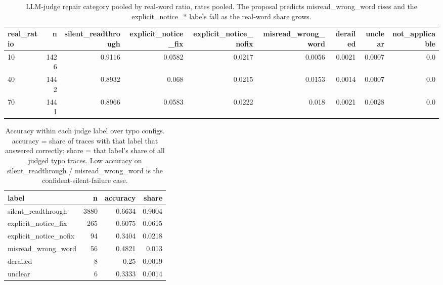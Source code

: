 \documentclass[11pt]{article}
\begin{document}
\begin{table}[H]
\centering
\caption{LLM-judge repair category pooled by real-word ratio, rates pooled. The proposal predicts misread\_wrong\_word rises and the explicit\_notice\_* labels fall as the real-word share grows.}
\small
\begin{adjustbox}{max width=\textwidth}
\begin{tabular}{lrrrrrrrr}
\toprule
\textbf{real\_ratio} & \textbf{n} & \textbf{silent\_readthrough} & \textbf{explicit\_notice\_fix} & \textbf{explicit\_notice\_nofix} & \textbf{misread\_wrong\_word} & \textbf{derailed} & \textbf{unclear} & \textbf{not\_applicable} \\
\midrule
10 & 1426 & 0.9116 & 0.0582 & 0.0217 & 0.0056 & 0.0021 & 0.0007 & 0.0 \\
40 & 1442 & 0.8932 & 0.068 & 0.0215 & 0.0153 & 0.0014 & 0.0007 & 0.0 \\
70 & 1441 & 0.8966 & 0.0583 & 0.0222 & 0.018 & 0.0021 & 0.0028 & 0.0 \\
\bottomrule
\end{tabular}
\end{adjustbox}
\end{table}

\begin{table}[H]
\centering
\caption{Accuracy within each judge label over typo configs. accuracy = share of traces with that label that answered correctly; share = that label's share of all judged typo traces. Low accuracy on silent\_readthrough / misread\_wrong\_word is the confident-silent-failure case.}
\small
\begin{adjustbox}{max width=\textwidth}
\begin{tabular}{lrrr}
\toprule
\textbf{label} & \textbf{n} & \textbf{accuracy} & \textbf{share} \\
\midrule
silent\_readthrough & 3880 & 0.6634 & 0.9004 \\
explicit\_notice\_fix & 265 & 0.6075 & 0.0615 \\
explicit\_notice\_nofix & 94 & 0.3404 & 0.0218 \\
misread\_wrong\_word & 56 & 0.4821 & 0.013 \\
derailed & 8 & 0.25 & 0.0019 \\
unclear & 6 & 0.3333 & 0.0014 \\
\bottomrule
\end{tabular}
\end{adjustbox}
\end{table}
\end{document}
